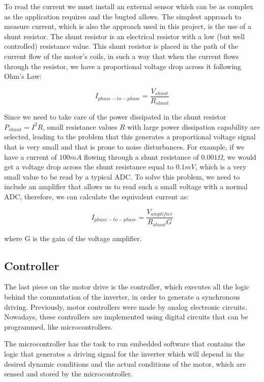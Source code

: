 To read the current we must install an external sensor which can be as complex as the application requires and the bugted allows. The simplest approach to measure current, which is also the approach used in this project, is the use of a shunt resistor. The shunt resistor is an electrical resistor with a low (but well controlled) resistance value. This shunt resistor is placed in the path of the current flow of the motor's coils, in such a way that when the current flows through the resistor, we have a proportional voltage drop across it following Ohm's Law:

\begin{equation}\label{ohm_shunt}
	I_{phase-to-phase} = \frac{V_{shunt}}{R_{shunt}}
\end{equation}

Since we need to take care of the power dissipated in the shunt resistor $P_{shunt} = I^{2}R$, small resistance values $R$ with large power dissipation capability are selected, leading to the problem that this generates a proportional voltage signal that is very small and that is prone to noise disturbances. For example, if we have a current of $100 mA$ flowing through a shunt resistance of $0.001 \Omega$, we would get a voltage drop across the shunt resistance equal to $0.1 mV$, which is a very small value to be read by a typical \acf{ADC}. To solve this problem, we need to include an amplifier that allows us to read such a small voltage with a normal \ac{ADC}, therefore, we can calculate the equivalent current as:

\begin{equation}\label{ohm_shunt}
	I_{phase-to-phase} = \frac{V_{amplifier}}{R_{shunt}G}
\end{equation}

where G is the gain of the voltage amplifier.

\subsection{Controller}

The last piece on the motor drive is the controller, which executes all the logic behind the commutation of the inverter, in order to generate a synchronous driving. Previously, motor controllers were made by analog electronic circuits. Nowadays, these controllers are implemented using digital circuits that can be programmed, like microcontrollers.

The microcontroller has the task to run embedded software that contains the logic that generates a driving signal for the inverter which will depend in the desired dynamic conditions and the actual conditions of the motor, which are sensed and stored by the microcontroller.

